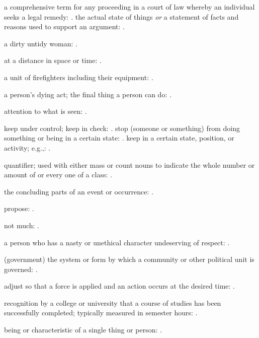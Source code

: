   a comprehensive term for any proceeding in a court of law whereby an individual seeks a legal remedy:   . the actual state of things \textit{or} a statement of facts and reasons used to support an argument: .

  a dirty untidy woman: .

  at a distance in space or time:   .

  a unit of firefighters including their equipment: .

  a person's dying act; the final thing a person can do: .

  attention to what is seen: .

  keep under control; keep in check:   . stop (someone or something) from doing something or being in a certain state:   . keep in a certain state, position, or activity; e.g.,:   .

  quantifier; used with either mass or count nouns to indicate the whole number or amount of or every one of a class: .

  the concluding parts of an event or occurrence:   .

  propose: .

  not much: .

  a person who has a nasty or unethical character undeserving of respect:   .

  (government) the system or form by which a community or other political unit is governed: .

  adjust so that a force is applied and an action occurs at the desired time: .

  recognition by a college or university that a course of studies has been successfully completed; typically measured in semester hours:   .

  being or characteristic of a single thing or person:   .

